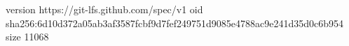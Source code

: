 version https://git-lfs.github.com/spec/v1
oid sha256:6d10d372a05ab3af3587fcbf9d7fef249751d9085e4788ac9e241d35d0c6b954
size 11068
